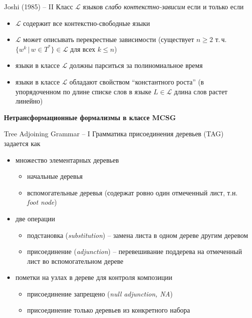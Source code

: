 \documentclass{beamer}
\begin{document}
\begin{frame}{Joshi (1985) -- II}
Класс $\mathcal{L}$ языков \textit{слабо контекстно-зависим} если и только если\\
\smallskip
\begin{itemize}
    \item $\mathcal{L}$ содержит все контекстно-свободные языки
    \item $\mathcal{L}$ может описывать перекрестные зависимости (существует $n \geq 2$ т.\,ч. $\{ w^k \, | \, w \in T^* \} \in \mathcal{L}$ для всех $k \leq n$)
    \item языки в классе $\mathcal{L}$ должны парситься за полиномиальное время
    \item языки в классе $\mathcal{L}$ обладают свойством ``константного роста'' (в упорядоченном по длине списке слов в языке $L \in \mathcal{L}$ длина слов растет линейно)
\end{itemize}
\end{frame}

\begin{frame}{}
\begin{center}
	\textbf{Нетрансформационные формализмы в классе MCSG}
\end{center}
\end{frame}

\begin{frame}{Tree Adjoining Grammar -- I}
Грамматика присоединения деревьев (TAG) задается как\\
\medskip
\begin{itemize}
    \item множество элементарных деревьев
        \begin{itemize}
            \item начальные деревья        
            \item вспомогательные деревья (содержат ровно один отмеченный лист, т.н. \textit{foot node})
        \end{itemize}
    \item две операции
        \begin{itemize}
            \item подстановка (\textit{substitution}) -- замена листа в одном дереве другим деревом
            \item присоединение (\textit{adjunction}) -- перевешивание поддерева на отмеченный лист во вспомогательном дереве
        \end{itemize}
    \item пометки на узлах в дереве для контроля композиции
        \begin{itemize}
            \item присоединение запрещено (\textit{null adjunction, NA})
            \item присоединение только деревьев из конкретного набора
        \end{itemize}
\end{itemize}
\end{frame}
\end{document}
